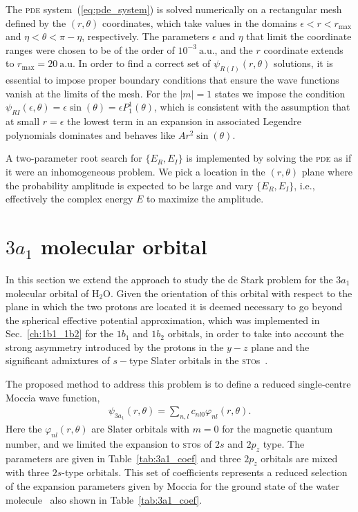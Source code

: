 The \textsc{pde} system~(\ref{eq:pde_system}) is solved numerically on
a rectangular mesh defined by the $(r, \theta)$ coordinates, which
take values in the domains $\epsilon < r < r_{\mathrm{max}}$ and $\eta
< \theta < \pi - \eta$, respectively. The parameters $\epsilon$ and
$\eta$ that limit the coordinate ranges were chosen to be of the order
of $10^{-3}\ \mathrm{a.u.}$, and the $r$ coordinate extends to
$r_{\mathrm{max}} = 20\ \mathrm{a.u.}$ In order to find a correct set
of $\psi_{R(I)}(r,\theta)$ solutions, it is essential to impose proper
boundary conditions that ensure the wave functions vanish at the
limits of the mesh. For the $|m| = 1$ states we impose the condition
$\psi_{R{I}}(\epsilon,\theta) = \epsilon \sin(\theta) = \epsilon
P_{1}^{1}(\theta)$, which is consistent with the assumption that at
small $r = \epsilon$ the lowest term in an expansion in associated
Legendre polynomials dominates and behaves like $A r^{2}
\sin(\theta)$.

A two-parameter root search for $\{E_{R}, E_{I}\}$ is implemented by
solving the \textsc{pde} as if it were an inhomogeneous problem. We
pick a location in the $(r,\theta)$ plane where the probability
amplitude is expected to be large and vary $\{E_{R}, E_{I}\}$, i.e.,
effectively the complex energy $E$ to maximize the amplitude.


\section{$3a_{1}$ molecular orbital}
\label{ch:3a1}

In this section we extend the approach to study the dc Stark problem
for the $3a_{1}$ molecular orbital of H$_{2}$O. Given the orientation
of this orbital with respect to the plane in which the two protons are
located it is deemed necessary to go beyond the spherical effective
potential approximation, which was implemented in
Sec.~\ref{ch:1b1_1b2} for the $1b_{1}$ and $1b_{2}$ orbitals, in order
to take into account the strong asymmetry introduced by the protons in
the $y-z$ plane and the significant admixtures of $s-$type Slater
orbitals in the \textsc{sto}s~\cite{Moccia_1964}.

The proposed method to address this problem is to define a reduced
single-centre Moccia wave function,
%
\begin{eqnarray}
\psi_{3a_{1}}(r,\theta) = \sum_{n,l} c_{nl0} \varphi_{nl}(r,\theta).
\label{eq:3a1Moccia_expansion}
\end{eqnarray}
%
Here the $\varphi_{nl}(r,\theta)$ are Slater orbitals with $m=0$ for
the magnetic quantum number, and we limited the expansion to
\textsc{sto}s of $2s$ and $2p_{z}$ type. The parameters are given in
Table~\ref{tab:3a1_coef} and three $2p_{z}$ orbitals are mixed with
three $2s$-type orbitals. This set of coefficients represents a
reduced selection of the expansion parameters given by Moccia for the
ground state of the water molecule~\cite{Moccia_1964} also shown in
Table~\ref{tab:3a1_coef}.

